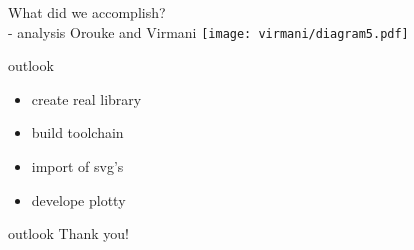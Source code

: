 \documentclass[ucs,9ptb]{beamer}
\begin{document}
\begin{frame}{What did we accomplish?\\- analysis}
  Orouke and Virmani
  \texttt{[image: virmani/diagram5.pdf]}
\end{frame}

\begin{frame}{outlook}
  \begin{itemize}
    \item create real library
    \item build toolchain
    \item import of svg's
    \item develope plotty
  \end{itemize}
\end{frame}

\begin{frame}{outlook}
  \hspace{40mm}\huge{Thank you!}
\end{frame}
\end{document}
